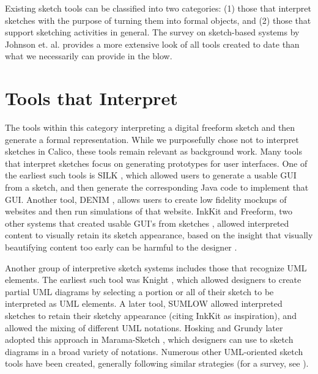 \documentclass[12pt,fleqn]{ucithesis}
\begin{document}
Existing sketch tools can be classified into two categories: (1) those that interpret sketches with the purpose of turning them into formal objects, and (2) those that support sketching activities in general. The survey on sketch-based systems by Johnson et. al. \citep{Johnson} provides a more extensive look of all tools created to date than what we necessarily can provide in the blow.

\section{Tools that Interpret}
\label{relatedwork:1}

The  tools within this category interpreting a digital freeform sketch and then generate a formal representation. While we purposefully chose not to interpret sketches in Calico, these tools remain relevant as background work.
Many tools that interpret sketches focus on generating prototypes for user interfaces. One of the earliest  such tools is SILK \citep{Landay}, which allowed users to generate a usable GUI from a sketch, and then generate the corresponding Java code to implement that GUI. Another tool, DENIM \citep{newman2003denim}, allows users to create low fidelity mockups of websites and then run simulations of that website.  InkKit and Freeform, two other systems that created usable GUI's from sketches \citep{chung2005inkkit,Plimmer}, allowed interpreted content to visually retain its sketch appearance, based on the insight that visually beautifying content too early can be harmful to the designer \citep{Shipman}. 

Another group of interpretive sketch systems includes those that recognize UML elements. The earliest such tool was Knight \citep{damm2000tool}, which allowed  designers to create partial UML diagrams by selecting a portion or all of their sketch to be interpreted as UML elements. A later tool, SUMLOW \citep{chen2008sumlow} allowed interpreted sketches to retain their sketchy appearance (citing InkKit as inspiration), and allowed the mixing of different UML notations. Hosking and Grundy later adopted this approach in Marama-Sketch \citep{Grundy}, which designers can use to sketch diagrams in a broad variety of notations. Numerous other UML-oriented sketch tools have been created, generally following similar strategies (for a survey, see \citep{Johnson} ). 
\end{document}
